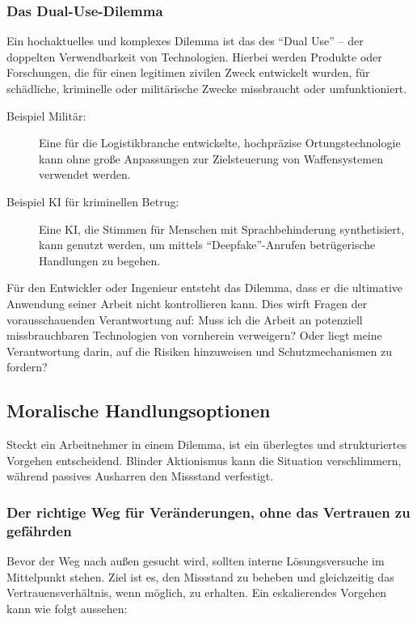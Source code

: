 \documentclass[
    12pt,               %
    a4paper,            %
    ngerman             %
]{scrartcl}
\begin{document}
\subsubsection*{Das Dual-Use-Dilemma}
Ein hochaktuelles und komplexes Dilemma ist das des \enquote{Dual Use} – der doppelten Verwendbarkeit von Technologien. Hierbei werden Produkte oder Forschungen, die für einen legitimen zivilen Zweck entwickelt wurden, für schädliche, kriminelle oder militärische Zwecke missbraucht oder umfunktioniert.
\begin{description}
    \item[Beispiel Militär:] Eine für die Logistikbranche entwickelte, hochpräzise Ortungstechnologie kann ohne große Anpassungen zur Zielsteuerung von Waffensystemen verwendet werden.
    \item[Beispiel KI für kriminellen Betrug:] Eine KI, die Stimmen für Menschen mit Sprachbehinderung synthetisiert, kann genutzt werden, um mittels \enquote{Deepfake}-Anrufen betrügerische Handlungen zu begehen.
\end{description}
Für den Entwickler oder Ingenieur entsteht das Dilemma, dass er die ultimative Anwendung seiner Arbeit nicht kontrollieren kann. Dies wirft Fragen der vorausschauenden Verantwortung auf: Muss ich die Arbeit an potenziell missbrauchbaren Technologien von vornherein verweigern? Oder liegt meine Verantwortung darin, auf die Risiken hinzuweisen und Schutzmechanismen zu fordern?

\subsection{Moralische Handlungsoptionen}
Steckt ein Arbeitnehmer in einem Dilemma, ist ein überlegtes und strukturiertes Vorgehen entscheidend. Blinder Aktionismus kann die Situation verschlimmern, während passives Ausharren den Missstand verfestigt.

\subsubsection*{Der richtige Weg für Veränderungen, ohne das Vertrauen zu gefährden}
Bevor der Weg nach außen gesucht wird, sollten interne Lösungsversuche im Mittelpunkt stehen. Ziel ist es, den Missstand zu beheben und gleichzeitig das Vertrauensverhältnis, wenn möglich, zu erhalten. Ein eskalierendes Vorgehen kann wie folgt aussehen:
\end{document}

